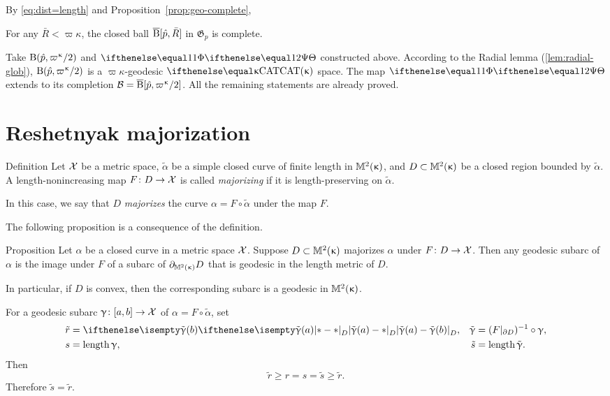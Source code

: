 By \ref{eq:dist=length} and Proposition~\ref{prop:geo-complete}, 


\begin{clm}{}\label{clm:complete-B} 
For any $\bar R<\varpi\kappa$, the closed ball
$\overline{\mathrm{B}}{}[\hat p,\bar R]$ in $\mathfrak{G}_p$ is complete.
\end{clm}

Take $\oBall(\hat p,\varpi\kappa/2)$ and $\map$ constructed above.
According to the Radial lemma (\ref{lem:radial-glob}), $\oBall(\hat p,\varpi\kappa/2)$ is a $\varpi\kappa$-geodesic $\CAT\kappa$ space.
The map $\map$ extends to its completion $\spc{B}=\cBall[\hat p,\varpi\kappa/2]$. 
All the remaining statements are already proved.
\qeds

\section{Reshetnyak majorization}\label{sec:resh-kirz}

\begin{thm}{Definition}\label{def:majorize}
Let $\mathcal{X}$ be a metric space,
$\tilde \alpha$ be a simple closed curve of finite length  in $\mathbb{M}_{{}}^{2}({\upkappa})$,
and $D\subset\Lob2{\kappa}$ be a closed region bounded by $\tilde \alpha$.
A length-nonincreasing map $F\:D\to\spc{X}$ is called \emph{majorizing} if it is length-preserving on $\tilde \alpha$.

In this case, we say that $D$ \emph{majorizes} the curve $\alpha=F\circ\tilde \alpha$ under the map $F$.
\end{thm}

The following proposition is a consequence of the definition.

\begin{thm}{Proposition}
\label{prop:majorize-geodesic} 
Let  $\alpha$  be a closed curve in a metric space $\mathcal{X}$.
Suppose $D\subset\Lob2{\kappa}$ majorizes $\alpha$ under $F\: D \to \spc{X}$.  
Then any geodesic subarc of $\alpha$ is the image under $F$ of a subarc of $\partial_{\mathbb{M}_{{}}^{2}({\upkappa})} D$ that is geodesic in the length metric of $D$.

In particular, if $D$ is convex, then the corresponding subarc is a geodesic in $\mathbb{M}_{{}}^{2}({\upkappa})$.
\end{thm}

 For a geodesic subarc $\gamma\:[a,b]\to\spc{X}$ of $\alpha=F\circ\tilde \alpha$, set
\begin{align*}
\tilde r&=\dist{\tilde \gamma(a)}{\tilde \gamma(b)}{D},
&
\tilde \gamma &= (F|_{\Fr D})^{-1}\circ\gamma,
\\
s&=\length \gamma,
&
\tilde s&= \length \tilde \gamma.
\end{align*}
Then
\[\tilde r\ge r = s =\tilde s\ge\tilde r.\]
Therefore $\tilde s=\tilde r$.
\qeds

